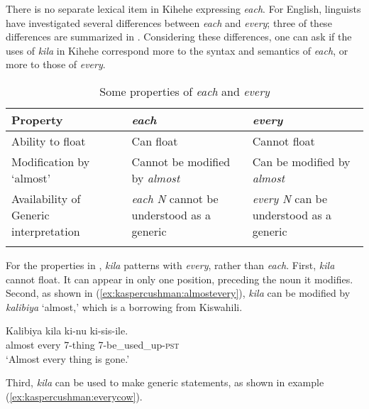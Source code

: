 \documentclass[output=paper,modfonts,nonflat]{langsci/langscibook}
\begin{document}
There is no separate lexical item in Kihehe expressing \textit{each}. For English, linguists have investigated several differences between \textit{each} and \textit{every}; three of these differences are summarized in . Considering these differences, one can ask if the uses of \textit{kila} in Kihehe correspond more to the syntax and semantics of \textit{each}, or more to those of \textit{every}.\largerpage[-2]

\begin{table}
\small
\caption{Some properties of \emph{each} and \emph{every} \citep{beghelli97}}
\label{tab:kaspercushman:everyeach}
\begin{tabularx}{\textwidth}{QQQ}%
\lsptoprule
Property                 & \textit{each}  & \textit{every}\\ 
\midrule
Ability to float         & Can float     & Cannot float \\ 
Modification by `almost'  & \nohyphens{Cannot be modified by \textit{almost}}                     & Can be modified by \textit{almost}                                                                           \\ 
\nohyphens{Availability of Generic interpretation}                 & \nohyphens{\textit{each N} cannot be understood as a generic}          & \textit{every N} can be understood as a   generic                  \\ 
\lspbottomrule
\end{tabularx}
\end{table}

For the properties in , \textit{kila} patterns with \textit{every}, rather than \textit{each}.  First, \textit{kila} cannot float. It can appear in only one position, preceding the noun it modifies. Second, as shown in (\ref{ex:kaspercushman:almostevery}), \textit{kila} can be modified by \textit{kalibiya} `almost,' which is a borrowing from Kiswahili. 

\begin{exe}
\ex 
\gll Kalibiya kila ki-nu ki-sis-ile.     \\
almost every 7-thing 7-be\_used\_up-\textsc{pst} \\
\glt `Almost every thing is gone.' \\ \label{ex:kaspercushman:almostevery}
\end{exe}

Third, \emph{kila} can be used to make generic statements, as shown in example (\ref{ex:kaspercushman:everycow}).\largerpage[-2]
\end{document}
